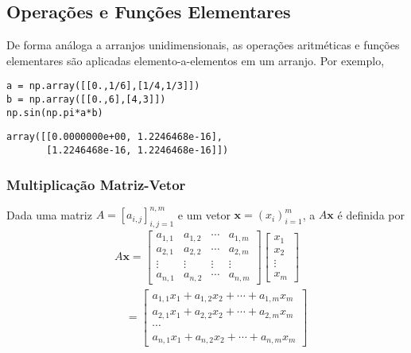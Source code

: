 \subsection{Operações e Funções Elementares}

De forma análoga a arranjos unidimensionais, as operações aritméticas e funções elementares são aplicadas elemento-a-elementos em um arranjo. Por exemplo,

\begin{lstlisting}
a = np.array([[0.,1/6],[1/4,1/3]])
b = np.array([[0.,6],[4,3]])
np.sin(np.pi*a*b)
\end{lstlisting}

\begin{verbatim}
array([[0.0000000e+00, 1.2246468e-16],
       [1.2246468e-16, 1.2246468e-16]])
\end{verbatim}

\subsubsection{Multiplicação Matriz-Vetor}

Dada uma matriz $A = [a_{i,j}]_{i,j=1}^{n,m}$ e um vetor $\pmb{x} = (x_i)_{i=1}^m$, a  $A\pmb{x}$ é definida por
\begin{align}
  & A\pmb{x} = \begin{bmatrix}
    a_{1,1} & a_{1,2} & \cdots & a_{1,m}\\
    a_{2,1} & a_{2,2} & \cdots & a_{2,m}\\
    \vdots & \vdots & \vdots & \vdots\\
    a_{n,1} & a_{n,2} & \cdots & a_{n,m}
  \end{bmatrix}\begin{bmatrix}
    x_1\\
    x_2\\
    \vdots\\
    x_m
  \end{bmatrix}\\
  & \text{}\quad =
    \begin{bmatrix}
      a_{1,1}x_1 + a_{1,2}x_2 + \cdots + a_{1,m}x_m\\
      a_{2,1}x_1 + a_{2,2}x_2 + \cdots + a_{2,m}x_m\\
      \cdots\\
      a_{n,1}x_1 + a_{n,2}x_2 + \cdots + a_{n,m}x_m
    \end{bmatrix}
\end{align}

